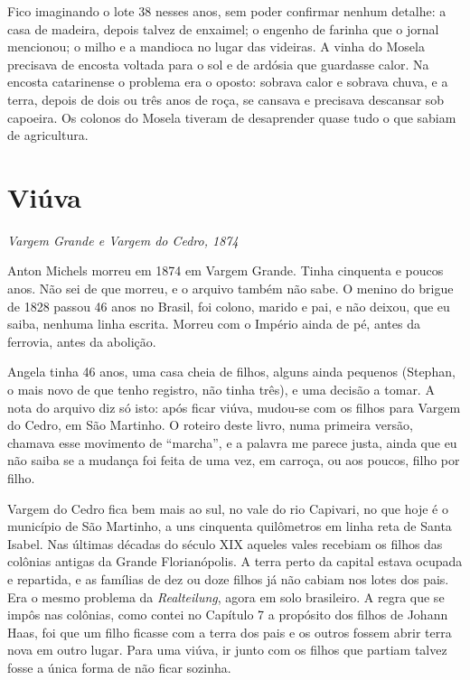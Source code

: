 \documentclass[
  brazilian,
  11pt,
  openany]{book}
\begin{document}
Fico imaginando o lote 38 nesses anos, sem poder confirmar nenhum
detalhe: a casa de madeira, depois talvez de enxaimel; o engenho de
farinha que o jornal mencionou; o milho e a mandioca no lugar das
videiras. A vinha do Mosela precisava de encosta voltada para o sol e de
ardósia que guardasse calor. Na encosta catarinense o problema era o
oposto: sobrava calor e sobrava chuva, e a terra, depois de dois ou três
anos de roça, se cansava e precisava descansar sob capoeira. Os colonos
do Mosela tiveram de desaprender quase tudo o que sabiam de agricultura.

\section{Viúva}\label{viuxfava}

\emph{Vargem Grande e Vargem do Cedro, 1874}

Anton Michels morreu em 1874 em Vargem Grande. Tinha cinquenta e poucos
anos. Não sei de que morreu, e o arquivo também não sabe. O menino do
brigue de 1828 passou 46 anos no Brasil, foi colono, marido e pai, e não
deixou, que eu saiba, nenhuma linha escrita. Morreu com o Império ainda
de pé, antes da ferrovia, antes da abolição.

Angela tinha 46 anos, uma casa cheia de filhos, alguns ainda pequenos
(Stephan, o mais novo de que tenho registro, não tinha três), e uma
decisão a tomar. A nota do arquivo diz só isto: após ficar viúva,
mudou-se com os filhos para Vargem do Cedro, em São Martinho. O roteiro
deste livro, numa primeira versão, chamava esse movimento de ``marcha'',
e a palavra me parece justa, ainda que eu não saiba se a mudança foi
feita de uma vez, em carroça, ou aos poucos, filho por filho.

Vargem do Cedro fica bem mais ao sul, no vale do rio Capivari, no que
hoje é o município de São Martinho, a uns cinquenta quilômetros em linha
reta de Santa Isabel. Nas últimas décadas do século XIX aqueles vales
recebiam os filhos das colônias antigas da Grande Florianópolis. A terra
perto da capital estava ocupada e repartida, e as famílias de dez ou
doze filhos já não cabiam nos lotes dos pais. Era o mesmo problema da
\emph{Realteilung}, agora em solo brasileiro. A regra que se impôs nas
colônias, como contei no Capítulo 7 a propósito dos filhos de Johann
Haas, foi que um filho ficasse com a terra dos pais e os outros fossem
abrir terra nova em outro lugar. Para uma viúva, ir junto com os filhos
que partiam talvez fosse a única forma de não ficar sozinha.
\end{document}
